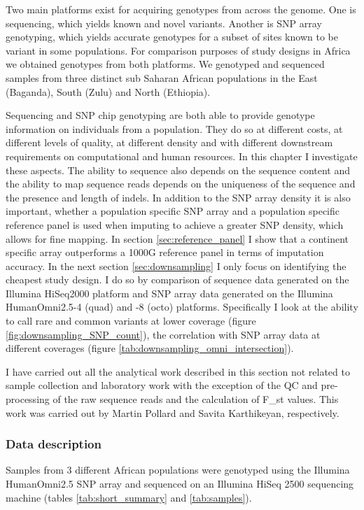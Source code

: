 Two main platforms exist for acquiring genotypes from across the genome. One is sequencing, which yields known and novel variants. Another is SNP array genotyping, which yields accurate genotypes for a subset of sites known to be variant in some populations. For comparison purposes of study designs in Africa we obtained genotypes from both platforms. We genotyped and sequenced samples from three distinct sub Saharan African populations in the East (Baganda), South (Zulu) and North (Ethiopia).

Sequencing and \gls{SNP} chip genotyping are both able to provide genotype information on individuals from a population. They do so at different costs, at different levels of quality, at different density and with different downstream requirements on computational and human resources. In this chapter I investigate these aspects. The ability to sequence also depends on the sequence content and the ability to map sequence reads depends on the uniqueness of the sequence and the presence and length of indels. In addition to the \gls{SNP} array density it is also important, whether a population specific \gls{SNP} array and a population specific reference panel is used when imputing to achieve a greater SNP density, which allows for fine mapping. In section \ref{sec:reference_panel} I show that a continent specific array outperforms a 1000G reference panel in terms of imputation accuracy. In the next section \ref{sec:downsampling} I only focus on identifying the cheapest study design. I do so by comparison of sequence data generated on the Illumina HiSeq2000 platform and SNP array data generated on the Illumina HumanOmni2.5-4 (quad) and -8 (octo) platforms. Specifically I look at the ability to call rare and common variants at lower coverage (figure \ref{fig:downsampling_SNP_count}), the correlation with SNP array data at different coverages (figure \ref{tab:downsampling_omni_intersection}).

I have carried out all the analytical work described in this section not related to sample collection and laboratory work with the exception of the QC and pre-processing of the raw sequence reads and the calculation of F_{st} values. This work was carried out by Martin Pollard and Savita Karthikeyan, respectively.

\subsubsection{Data description}
Samples from 3 different African populations were genotyped using the Illumina HumanOmni2.5 SNP array and sequenced on an Illumina HiSeq 2500 sequencing machine (tables \ref{tab:short_summary} and \ref{tab:samples}).

